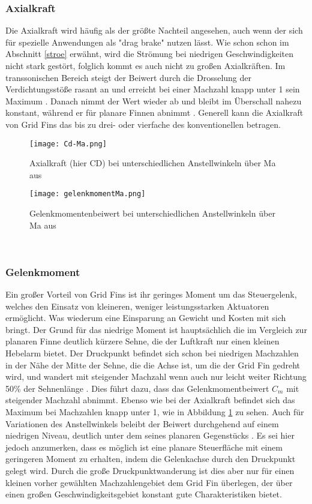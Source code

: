 \subsubsection{Axialkraft}
Die Axialkraft wird häufig als der größte Nachteil angesehen, auch wenn der sich für spezielle Anwendungen als "drag brake" nutzen lässt. Wie schon schon im Abschnitt \ref{stroe} erwähnt, wird die Strömung bei niedrigen Geschwindigkeiten nicht stark gestört, folglich kommt es auch nicht zu großen Axialkräften. Im transsonischen Bereich steigt der Beiwert durch die Drosselung der Verdichtungsstöße rasant an und erreicht bei einer Machzahl knapp unter 1 sein Maximum \cite{solver}. Danach nimmt der Wert wieder ab und bleibt im Überschall nahezu konstant, während er für planare Finnen abnimmt \cite{vergleichPlanarNATO}. Generell kann die Axialkraft von Grid Fins das bis zu drei- oder  vierfache des konventionellen betragen.
\begin{figure}[h]
	\begin{minipage}[t]{0.45\linewidth}
		\centering
		\texttt{[image: Cd-Ma.png]}
		\caption{Axialkraft (hier CD) bei unterschiedlichen Anstellwinkeln über Ma aus \cite{solver}}
	\end{minipage}
	\hfill
	\begin{minipage}[t]{0.45\linewidth}
		\centering
		\texttt{[image: gelenkmomentMa.png]}
		\caption{Gelenkmomentenbeiwert bei unterschiedlichen Anstellwinkeln über Ma aus \cite{solver}}
		\label{abb_Mm-Ma}
	\end{minipage}
\end{figure}\\
\subsubsection{Gelenkmoment}
Ein großer Vorteil von Grid Fins ist ihr geringes Moment um das Steuergelenk, welches den Einsatz von kleineren, weniger leistungsstarken Aktuatoren ermöglicht. Was wiederum eine Einsparung an Gewicht und Kosten mit sich bringt. Der Grund für das niedrige Moment ist hauptsächlich die im Vergleich zur planaren Finne deutlich kürzere Sehne, die der Luftkraft nur einen kleinen Hebelarm bietet. Der Druckpunkt befindet sich schon bei niedrigen Machzahlen in der Nähe der Mitte der Sehne, die die Achse ist, um die der Grid Fin gedreht wird, und wandert mit steigender Machzahl wenn auch nur leicht weiter Richtung 50\% der Sehnenlänge \cite{vergleichPlanarNATO}. Dies führt dazu, dass das Gelenkmomentbeiwert $C_m$ mit steigender Machzahl abnimmt. Ebenso wie bei der Axialkraft befindet sich das Maximum bei Machzahlen knapp unter 1, wie in Abbildung \ref{abb_Mm-Ma} zu sehen. Auch für Variationen des Anstellwinkels beleibt der Beiwert durchgehend auf einem niedrigen Niveau, deutlich unter dem seines planaren Gegenstücks \cite{vergleichPlanarNATO}. Es sei hier jedoch anzumerken, dass es möglich ist eine planare Steuerfläche mit einem geringeren Moment zu erhalten, indem die Gelenkachse durch den Druckpunkt gelegt wird. Durch die große Druckpunktwanderung ist dies aber nur für einen kleinen vorher gewählten Machzahlengebiet dem Grid Fin überlegen, der über einen großen Geschwindigkeitsgebiet konstant gute Charakteristiken bietet.
